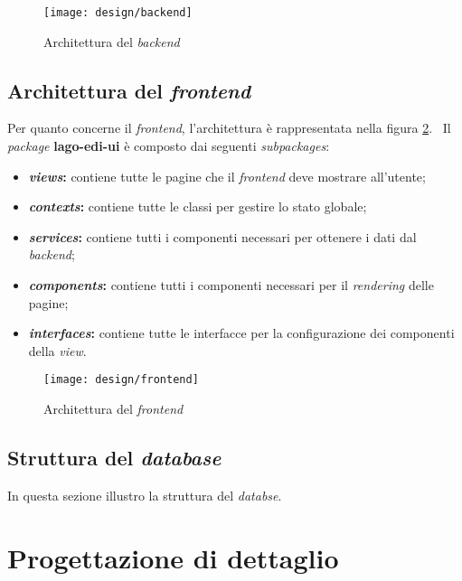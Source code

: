 \begin{figure}[!ht]
  \begin{center}
    \texttt{[image: design/backend]}
    \caption{Architettura del \emph{\gls{backend}}}
    \label{fig:be-design}
  \end{center}
\end{figure}

\subsection{Architettura del \emph{\gls{frontend}}}
Per quanto concerne il \emph{\gls{frontend}}, l'architettura è rappresentata nella figura \ref{fig:fe-design}. \
Il \emph{package} \textbf{lago-edi-ui} è composto dai seguenti \emph{subpackages}:
\begin{itemize}
  \item \textbf{\emph{views}:} contiene tutte le pagine che il \emph{\gls{frontend}} deve mostrare all'utente;
  \item \textbf{\emph{contexts}:} contiene tutte le classi per gestire lo stato globale;
  \item \textbf{\emph{services}:} contiene tutti i componenti necessari per ottenere i dati dal \emph{\gls{backend}};
  \item \textbf{\emph{components}:} contiene tutti i componenti necessari per il \emph{rendering} delle pagine;
  \item \textbf{\emph{interfaces}:} contiene tutte le interfacce per la configurazione dei componenti della \emph{view}.
\end{itemize}

\begin{figure}[!ht]
  \begin{center}
    \texttt{[image: design/frontend]}
    \caption{Architettura del \emph{\gls{frontend}}}
    \label{fig:fe-design}
  \end{center}
\end{figure}

\subsection{Struttura del \emph{database}}
In questa sezione illustro la struttura del \emph{databse}.

\section{Progettazione di dettaglio}

